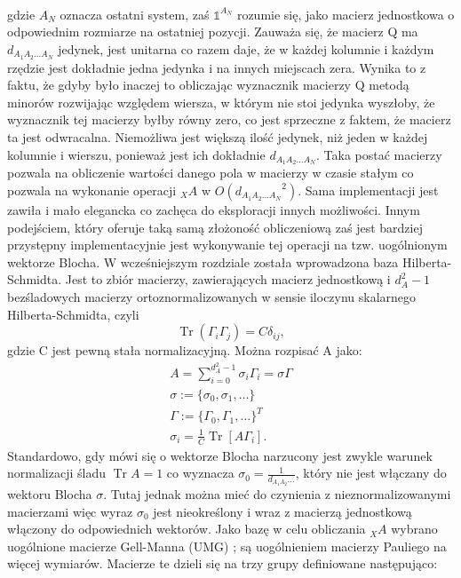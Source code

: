 \documentclass[10pt]{article} %
\DeclareMathOperator{\Trs}{Tr}
\newcommand{\I}{\mathbb{1}}
\begin{document}
\begin{appendices}
\begin{gather}
\end{gather} gdzie $A_N$ oznacza ostatni system, zaś $\I^{A_N}$ rozumie się, jako macierz jednostkowa o odpowiednim rozmiarze na ostatniej pozycji. Zauważa się, że macierz Q ma $d_{A_1 A_2 \dots A_N}$ jedynek, jest unitarna co razem daje, że w każdej kolumnie i każdym rzędzie jest dokładnie jedna jedynka i na innych miejscach zera. Wynika to z faktu, że gdyby było inaczej to obliczając wyznacznik macierzy Q metodą minorów rozwijając względem wiersza, w którym nie stoi jedynka wyszłoby, że wyznacznik tej macierzy byłby równy zero, co jest sprzeczne z faktem, że macierz ta jest odwracalna. Niemożliwa jest większą ilość jedynek, niż jeden w każdej kolumnie i wierszu, ponieważ jest ich dokładnie $d_{A_1A_2\dots A_N}$. Taka postać macierzy pozwala na obliczenie wartości danego pola w macierzy w czasie stałym co pozwala na wykonanie operacji ${}_XA$ w $O({d_{A_1 A_2 \dots A_N}}^2)$. Sama implementacji jest zawiła i mało elegancka co zachęca do eksploracji innych możliwości. Innym podejściem, który oferuje taką samą złożoność obliczeniową zaś jest bardziej przystępny implementacyjnie jest wykonywanie tej operacji na tzw. uogólnionym wektorze Blocha. W wcześniejszym rozdziale została wprowadzona baza Hilberta-Schmidta. Jest to zbiór macierzy, zawierających macierz jednostkową i $d_A^2-1$ bezśladowych macierzy ortoznormalizowanych w sensie iloczynu skalarnego Hilberta-Schmidta, czyli
\begin{equation}
\Trs \left( \Gamma_i \Gamma_j \right) = C\delta_{ij},
\end{equation} gdzie C jest pewną stała normalizacyjną.
Można rozpisać A jako:
\begin{gather}
A = \sum_{i=0}^{d^2_A-1} \sigma_i \Gamma_i = \mathbb{\sigma} \Gamma \\
\mathbb{\sigma} := \{ \sigma_0, \sigma_1, \dots \} \\
\Gamma := \{ \Gamma_0, \Gamma_1, \dots \}^T \\
\sigma_i = \frac{1}{C} \Trs \left[ A \Gamma_i \right].
\end{gather} Standardowo, gdy mówi się o wektorze Blocha narzucony jest zwykle warunek normalizacji śladu $\Trs A = 1$ co wyznacza $\sigma_0 = \frac{1}{d_{A_1A_2} \dots}$, który nie jest włączany do wektoru Blocha $\mathbb{\sigma}$. Tutaj jednak można mieć do czynienia z nieznormalizowanymi macierzami więc
wyraz $\sigma_0$ jest nieokreślony i wraz z macierzą jednostkową włączony do odpowiednich wektorów. Jako bazę w celu obliczania ${}_XA$ wybrano uogólnione macierze Gell-Manna (UMG) \cite{gell_mann}; są uogólnieniem macierzy Pauliego na więcej wymiarów. Macierze te dzieli się na trzy grupy definiowane następująco:

\end{appendices}
\end{document}

